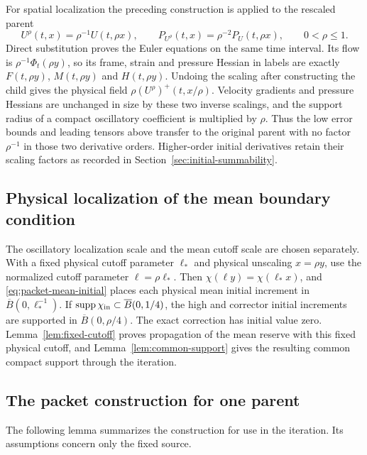 \documentclass[11pt]{article}
\theoremstyle{definition}
\begin{document}
For spatial localization the preceding construction is applied to the
rescaled parent
\[
 U^\rho(t,x)=\rho^{-1}U(t,\rho x),\qquad
 P_{U^\rho}(t,x)=\rho^{-2}P_U(t,\rho x),\qquad 0<\rho\le1.
\]
Direct substitution proves the Euler equations on the same time interval.
Its flow is $\rho^{-1}\Phi_t(\rho y)$, so its frame, strain and
pressure Hessian in labels are exactly $F(t,\rho y)$,
$M(t,\rho y)$ and $H(t,\rho y)$. Undoing the scaling after constructing
the child gives the physical field
$\rho(U^\rho)^+(t,x/\rho)$. Velocity gradients and pressure Hessians
are unchanged in size by these two inverse scalings, and the support
radius of a compact oscillatory coefficient is multiplied by $\rho$.
Thus the low error bounds and leading tensors above transfer to the
original parent with no factor $\rho^{-1}$ in those two derivative
orders. Higher-order initial derivatives retain their scaling
factors as recorded in Section~\ref{sec:initial-summability}.

\subsection{Physical localization of the mean boundary condition}
The oscillatory localization scale and the mean cutoff scale are chosen
separately. With a fixed physical cutoff parameter $\ell_*$ and physical
unscaling $x=\rho y$, use the normalized cutoff parameter
$\ell=\rho\ell_*$. Then
$\chi(\ell y)=\chi(\ell_*x)$, and
\eqref{eq:packet-mean-initial} places each physical mean initial
increment in $\overline B(0,\ell_*^{-1})$. If
$\operatorname{supp}\chi_{\rm in}\subset\overline B(0,1/4)$, the high
and corrector initial increments are supported in
$\overline B(0,\rho/4)$. The exact correction has initial value zero.
Lemma~\ref{lem:fixed-cutoff} proves propagation of the mean reserve
with this fixed physical cutoff, and Lemma~\ref{lem:common-support}
gives the resulting common compact support through the iteration.


\subsection{The packet construction for one parent}
The following lemma summarizes the construction for use in the iteration.
Its assumptions concern only the fixed source.
\end{document}
